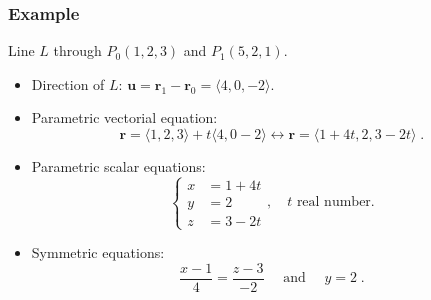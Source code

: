 \begin{frame}
\end{frame}


\begin{frame}
 \frametitle{Example}

Line $L$ through $P_0(1,2,3)$ and $P_1(5,2,1)$.

\begin{itemize}
 \item<2-> Direction of $L$: $\textbf{u} = \textbf{r}_1-\textbf{r}_0 = \langle 4, 0, -2\rangle$.
\item<3-> Parametric vectorial equation:
%
$$\textbf{r} = \langle 1,2,3\rangle + t \langle 4, 0 -2\rangle \leftrightarrow \textbf{r} = \langle 1+4t, 2, 3-2t\rangle\; .$$
%
\item<4-> Parametric scalar equations:
$$\left\{ \begin{array}{ll}
           x & = 1+4t \\
	   y & = 2 \\
           z & = 3-2t
          \end{array}
\right. , \quad t \text{ real number.}$$
%
\item<5-> Symmetric equations:
%
$$\frac{x-1}{4} = \frac{z-3}{-2} \quad \text{ and } \quad y=2\; .$$
\end{itemize}

\end{frame}

